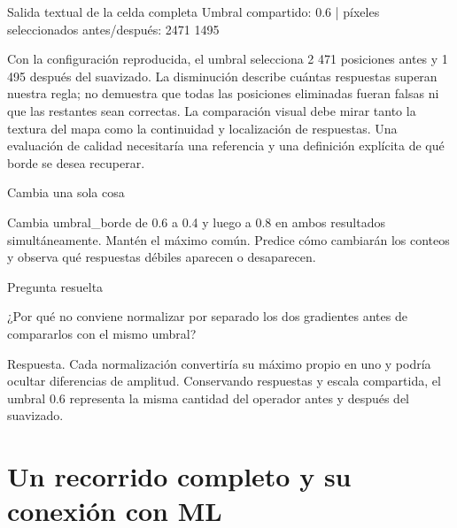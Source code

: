 \begin{Salida}{Salida textual de la celda completa}
Umbral compartido: 0.6 | píxeles seleccionados antes/después: 2471 1495
\end{Salida}



Con la configuración reproducida, el umbral selecciona 2 471 posiciones antes y 1 495 después del suavizado. La disminución describe cuántas respuestas superan nuestra regla; no demuestra que todas las posiciones eliminadas fueran falsas ni que las restantes sean correctas. La comparación visual debe mirar tanto la textura del mapa como la continuidad y localización de respuestas. Una evaluación de calidad necesitaría una referencia y una definición explícita de qué borde se desea recuperar.



\begin{Practica}{Cambia una sola cosa}

Cambia umbral\_borde de 0.6 a 0.4 y luego a 0.8 en ambos resultados simultáneamente. Mantén el máximo común. Predice cómo cambiarán los conteos y observa qué respuestas débiles aparecen o desaparecen.


\end{Practica}


\begin{Idea}{Pregunta resuelta}

¿Por qué no conviene normalizar por separado los dos gradientes antes de compararlos con el mismo umbral?


Respuesta. Cada normalización convertiría su máximo propio en uno y podría ocultar diferencias de amplitud. Conservando respuestas y escala compartida, el umbral 0.6 representa la misma cantidad del operador antes y después del suavizado.


\end{Idea}

\chapter[Procesamiento y ML]{Un recorrido completo y su conexión con ML}

